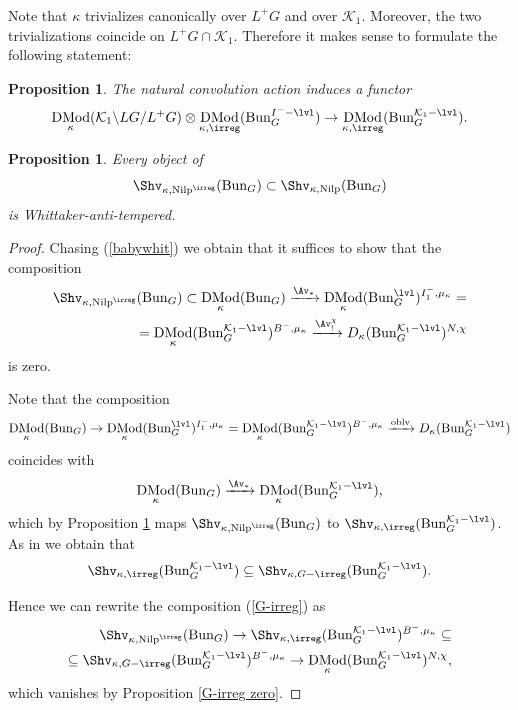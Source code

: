 \documentclass[9pt]{amsart}
\newcommand{\cK}{{\mathcal K}}
\DeclareMathOperator{\oblv}{{oblv}}
\DeclareMathOperator{\Nilp}{{Nilp}} \DeclareMathOperator{\op}{{op}}
\newtheorem{pr}[subsubsection]{Proposition}
\numberwithin{equation}{section}
\DeclareMathOperator{\D}{{DMod}}
\begin{document}
\subsubsection{} Note that $\kappa$ trivializes canonically over $L^+G$ and over $\cK_1$. Moreover, the two trivializations coincide on $L^+G \cap \cK_1$.  Therefore it makes sense to formulate the following statement:
\begin{pr}\label{irregular convolution}
	The natural convolution action induces a functor 
	$$\D_{\kappa}(\cK_1 \backslash LG / L^+G) \otimes \D_{\kappa, \irreg}(\Bun_G^{I^- - \lvl}) \rightarrow \D_{\kappa, \irreg}(\Bun_G^{\cK_1 - \lvl}).$$
\end{pr}

\begin{pr}\label{temperedSS}
	Every object of $$\Shv_{\kappa, \Nilp^{\irreg}}(\Bun_G) \subset \Shv_{\kappa, \Nilp}(\Bun_G)$$ is Whittaker-anti-tempered.
\end{pr}

\begin{proof}
	Chasing (\ref{babywhit}) we obtain that it suffices to show that the composition 
	\begin{equation}\label{G-irreg}
	\begin{split}
	\Shv_{\kappa, \Nilp^{\irreg}}(\Bun_G) \subset \D_{\kappa}(\Bun_G) \xrightarrow{\Av_*} \D_{\kappa}(\Bun_G^{\lvl})^{I_1^-, \mu_{\kappa}}=\\ =\D_{\kappa}(\Bun_G^{\cK_1- \lvl})^{B^-, \mu_{\kappa}} \xrightarrow{\Av_!^{\chi}} D_{\kappa}(\Bun_G^{\cK_1 -\lvl})^{N, \chi}
	\end{split}
	\end{equation}
	is zero. 
	
	Note that the composition
	\begin{equation}
		\D_{\kappa}(\Bun_G) \rightarrow \D_{\kappa}(\Bun_G^{\lvl})^{I_1^-, \mu_{\kappa}}= \D_{\kappa}(\Bun_G^{\cK_1- \lvl})^{B^-, \mu_{\kappa}} \xrightarrow{\oblv} D_{\kappa}(\Bun_G^{\cK_1- \lvl})
	\end{equation}
	coincides with 
	$$	\D_{\kappa}(\Bun_G)  \xrightarrow{\Av_*} \D_{\kappa}(\Bun_G^{\cK_1- \lvl}),$$
	which by  Proposition \ref{irregular convolution} maps $\Shv_{\kappa, \Nilp^{\irreg}}(\Bun_G)$ to $\Shv_{\kappa, \irreg}(\Bun_G^{\cK_1 -\lvl})$.  As in \cite[4.5.2]{FR} we obtain that 
	$$\Shv_{\kappa, \irreg}(\Bun_G^{\cK_1 -\lvl}) \subseteq \Shv_{\kappa, G-\irreg}(\Bun_G^{\cK_1 -\lvl}).$$
	
	Hence we can rewrite the composition (\ref{G-irreg}) as 
	\begin{equation}
		\begin{split}
		\Shv_{\kappa, \Nilp^{\irreg}}(\Bun_G) \rightarrow \Shv_{\kappa, \irreg}(\Bun_G^{\cK_1 -\lvl})^{B^-, \mu_{\kappa}} \subseteq \\
		\subseteq \Shv_{\kappa, G-\irreg}(\Bun_G^{\cK_1 -\lvl})^{B^-, \mu_{\kappa}}\rightarrow \D_{\kappa}(\Bun_G^{\cK_1 -\lvl})^{N, \chi},
		\end{split}
	\end{equation}
	which vanishes by Proposition \ref{G-irreg zero}.
\end{proof}
\end{document}
